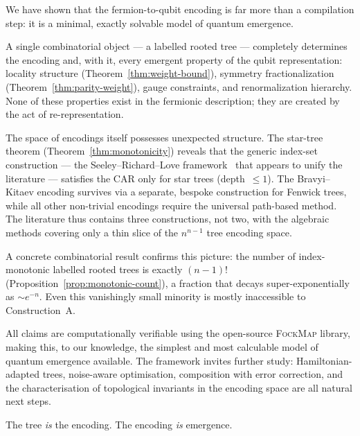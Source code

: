 %

We have shown that the fermion-to-qubit encoding is far more than a
compilation step: it is a minimal, exactly solvable model of quantum
emergence.

A single combinatorial object --- a labelled rooted tree --- completely
determines the encoding and, with it, every emergent property of the
qubit representation: locality structure (Theorem~\ref{thm:weight-bound}),
symmetry fractionalization (Theorem~\ref{thm:parity-weight}), gauge
constraints, and renormalization hierarchy.  None of these properties
exist in the fermionic description; they are created by the act of
re-representation.

The space of encodings itself possesses unexpected structure.  The
star-tree theorem (Theorem~\ref{thm:monotonicity}) reveals that the
generic index-set construction --- the Seeley--Richard--Love
framework~\cite{seeley2012} that appears to unify the literature ---
satisfies the CAR only for star trees (depth~$\le 1$).  The
Bravyi--Kitaev encoding survives via a separate, bespoke construction
for Fenwick trees, while all other non-trivial encodings require the
universal path-based method.  The literature thus contains three
constructions, not two, with the algebraic methods covering only a
thin slice of the $n^{n-1}$ tree encoding space.

A concrete combinatorial result confirms this picture: the number of
index-monotonic labelled rooted trees is exactly $(n{-}1)!$
(Proposition~\ref{prop:monotonic-count}), a fraction that decays
super-exponentially as $\sim e^{-n}$.  Even this vanishingly small
minority is mostly inaccessible to Construction~A.

All claims are computationally verifiable using the open-source
\textsc{FockMap} library, making this, to our knowledge, the simplest
and most calculable model of quantum emergence available.  The framework
invites further study: Hamiltonian-adapted trees, noise-aware
optimisation, composition with error correction, and the
characterisation of topological invariants in the encoding space are
all natural next steps.

The tree \emph{is} the encoding.  The encoding \emph{is} emergence.

